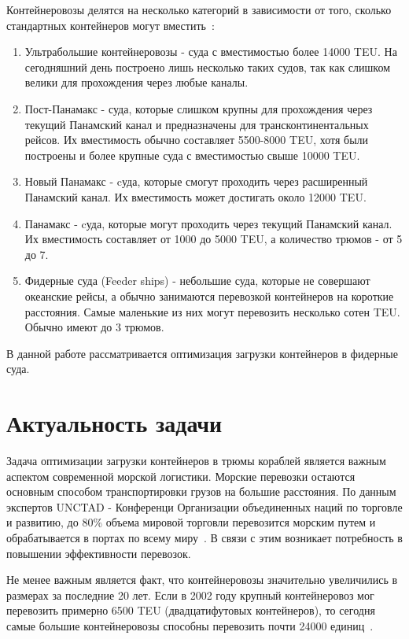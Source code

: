 Контейнеровозы делятся на несколько категорий в зависимости от того, сколько стандартных контейнеров могут вместить~\cite{ship_types}:
\begin{enumerate}
	\item Ультрабольшие контейнеровозы - суда с вместимостью более 14000 TEU. На сегодняшний день построено лишь несколько таких судов, так как слишком велики для прохождения через любые каналы.
	\item Пост-Панамакс - суда, которые слишком крупны для прохождения через текущий Панамский канал и предназначены для трансконтинентальных рейсов. Их вместимость обычно составляет 5500-8000 TEU, хотя были построены и более крупные суда с вместимостью свыше 10000 TEU.
	\item Новый Панамакс - cуда, которые смогут проходить через расширенный Панамский канал. Их вместимость может достигать около 12000 TEU.
	\item Панамакс - cуда, которые могут проходить через текущий Панамский канал. Их вместимость составляет от 1000 до 5000 TEU, а количество трюмов - от 5 до 7.
    \item Фидерные суда (Feeder ships) - небольшие суда, которые не совершают океанские рейсы, а обычно занимаются перевозкой контейнеров на короткие расстояния. Самые маленькие из них могут перевозить несколько сотен TEU. Обычно имеют до 3 трюмов.
\end{enumerate}

В данной работе рассматривается оптимизация загрузки контейнеров в фидерные суда.

\section{Актуальность задачи}

Задача оптимизации загрузки контейнеров в трюмы кораблей является важным аспектом современной морской логистики. Морские перевозки остаются основным способом транспортировки грузов на большие расстояния. По данным экспертов UNCTAD - Конференци Организации объединенных наций по торговле и развитию, до 80\% объема мировой торговли перевозится морским путем и обрабатывается в портах по всему миру~\cite{OON}. В связи с этим возникает потребность в повышении эффективности перевозок.

Не менее важным является факт, что контейнеровозы значительно увеличились в размерах за последние 20 лет. Если в 2002 году крупный контейнеровоз мог перевозить примерно 6500 TEU (двадцатифутовых контейнеров), то сегодня самые большие контейнеровозы способны перевозить почти 24000 единиц~\cite{container_max_number}. 

